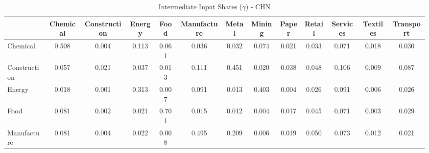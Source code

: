 \begin{table}[htbp]
\centering
\caption{Intermediate Input Shares ($\gamma$) - CHN} 
\label{tab:gamma_CHN}
\begin{tabular}{lcccccccccccc}
  \hline
 & Chemical & Construction & Energy & Food & Manufacture & Metal & Mining & Paper & Retail & Services & Textiles & Transport \\ 
  \hline
Chemical & \textcolor[RGB]{4,2,251}{0.508} & \textcolor[RGB]{243,157,12}{0.004} & \textcolor[RGB]{50,32,205}{0.113} & \textcolor[RGB]{89,57,166}{0.061} & \textcolor[RGB]{128,82,128}{0.036} & \textcolor[RGB]{138,89,117}{0.032} & \textcolor[RGB]{76,49,179}{0.074} & \textcolor[RGB]{166,108,89}{0.021} & \textcolor[RGB]{133,86,122}{0.033} & \textcolor[RGB]{81,53,174}{0.071} & \textcolor[RGB]{177,115,78}{0.018} & \textcolor[RGB]{142,92,113}{0.030} \\ 
  Construction & \textcolor[RGB]{92,60,163}{0.057} & \textcolor[RGB]{161,104,94}{0.021} & \textcolor[RGB]{120,78,135}{0.037} & \textcolor[RGB]{200,129,55}{0.013} & \textcolor[RGB]{51,33,204}{0.111} & \textcolor[RGB]{11,7,244}{0.451} & \textcolor[RGB]{170,110,85}{0.020} & \textcolor[RGB]{117,76,138}{0.038} & \textcolor[RGB]{101,65,154}{0.048} & \textcolor[RGB]{53,34,202}{0.106} & \textcolor[RGB]{214,139,41}{0.009} & \textcolor[RGB]{64,41,191}{0.087} \\ 
  Energy & \textcolor[RGB]{181,117,74}{0.018} & \textcolor[RGB]{251,163,4}{0.001} & \textcolor[RGB]{18,11,237}{0.313} & \textcolor[RGB]{223,144,32}{0.007} & \textcolor[RGB]{62,40,193}{0.091} & \textcolor[RGB]{202,131,53}{0.013} & \textcolor[RGB]{14,9,241}{0.403} & \textcolor[RGB]{237,154,18}{0.004} & \textcolor[RGB]{151,97,104}{0.026} & \textcolor[RGB]{60,39,195}{0.091} & \textcolor[RGB]{227,147,28}{0.006} & \textcolor[RGB]{149,96,106}{0.026} \\ 
  Food & \textcolor[RGB]{66,42,189}{0.081} & \textcolor[RGB]{250,162,5}{0.002} & \textcolor[RGB]{165,107,90}{0.021} & \textcolor[RGB]{0,0,255}{0.701} & \textcolor[RGB]{195,126,60}{0.015} & \textcolor[RGB]{209,135,46}{0.012} & \textcolor[RGB]{244,158,11}{0.004} & \textcolor[RGB]{188,121,67}{0.017} & \textcolor[RGB]{108,70,147}{0.045} & \textcolor[RGB]{83,54,172}{0.071} & \textcolor[RGB]{246,159,9}{0.003} & \textcolor[RGB]{145,94,110}{0.029} \\ 
  Manufacture & \textcolor[RGB]{67,44,188}{0.081} & \textcolor[RGB]{239,155,16}{0.004} & \textcolor[RGB]{156,101,99}{0.022} & \textcolor[RGB]{218,141,37}{0.008} & \textcolor[RGB]{5,3,250}{0.495} & \textcolor[RGB]{23,15,232}{0.209} & \textcolor[RGB]{228,148,27}{0.006} & \textcolor[RGB]{175,113,80}{0.019} & \textcolor[RGB]{96,62,159}{0.050} & \textcolor[RGB]{78,50,177}{0.073} & \textcolor[RGB]{207,134,48}{0.012} & \textcolor[RGB]{159,103,96}{0.021} \\ 

\end{tabular}
\end{table}
